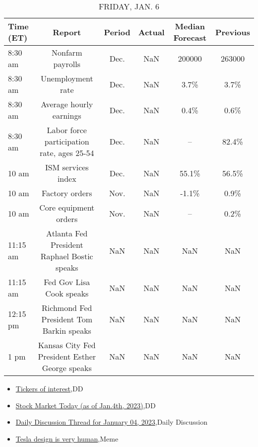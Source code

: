 \documentclass{article}%
\begin{document}
\begin{table}[htbp]%
\caption{FRIDAY, JAN. 6}%
\centering%
\begin{adjustbox}{width=1\textwidth}%
\begin{tabular}{lccccc}
\toprule
Time (ET) &                                         Report & Period & Actual & Median Forecast & Previous \\
\midrule
  8:30 am &                               Nonfarm payrolls &   Dec. &    NaN &          200000 &   263000 \\
  8:30 am &                              Unemployment rate &   Dec. &    NaN &            3.7\% &     3.7\% \\
  8:30 am &                        Average hourly earnings &   Dec. &    NaN &            0.4\% &     0.6\% \\
  8:30 am &     Labor force participation rate, ages 25-54 &   Dec. &    NaN &              -- &    82.4\% \\
    10 am &                             ISM services index &   Dec. &    NaN &           55.1\% &    56.5\% \\
    10 am &                                 Factory orders &   Nov. &    NaN &           -1.1\% &     0.9\% \\
    10 am &                          Core equipment orders &   Nov. &    NaN &              -- &     0.2\% \\
 11:15 am &    Atlanta Fed President Raphael Bostic speaks &    NaN &    NaN &             NaN &      NaN \\
 11:15 am &                       Fed Gov Lisa Cook speaks &    NaN &    NaN &             NaN &      NaN \\
 12:15 pm &       Richmond Fed President Tom Barkin speaks &    NaN &    NaN &             NaN &      NaN \\
     1 pm & Kansas City Fed President Esther George speaks &    NaN &    NaN &             NaN &      NaN \\
\bottomrule
\end{tabular}
%
\end{adjustbox}%
\end{table}

%
\begin{itemize}%
\item%
\href{https://reddit.com/r/wallstreetbets/comments/103314e/tickers\_of\_interest/}{Tickers of interest},DD%
\item%
\href{https://reddit.com/r/wallstreetbets/comments/1031r28/stock\_market\_today\_as\_of\_jan4th\_2023/}{Stock Market Today (as of Jan.4th, 2023)},DD%
\item%
\href{https://reddit.com/r/wallstreetbets/comments/1030t1j/daily\_discussion\_thread\_for\_january\_04\_2023/}{Daily Discussion Thread for January 04, 2023},Daily Discussion%
\item%
\href{https://reddit.com/r/wallstreetbets/comments/102zjj6/tesla\_design\_is\_very\_human/}{Tesla design is very human},Meme%
\end{itemize}%
\end{document}

